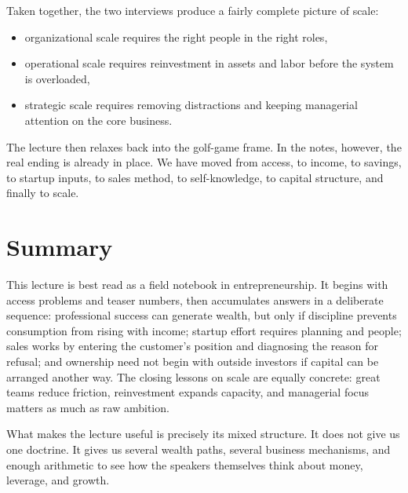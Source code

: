 Taken together, the two interviews produce a fairly complete picture of scale:
\begin{itemize}
\item organizational scale requires the right people in the right roles,
\item operational scale requires reinvestment in assets and labor before the system is overloaded,
\item strategic scale requires removing distractions and keeping managerial attention on the core business.
\end{itemize}

The lecture then relaxes back into the golf-game frame. In the notes, however, the real ending is already in place. We have moved from access, to income, to savings, to startup inputs, to sales method, to self-knowledge, to capital structure, and finally to scale.

\section{Summary}

This lecture is best read as a field notebook in entrepreneurship. It begins with access problems and teaser numbers, then accumulates answers in a deliberate sequence: professional success can generate wealth, but only if discipline prevents consumption from rising with income; startup effort requires planning and people; sales works by entering the customer's position and diagnosing the reason for refusal; and ownership need not begin with outside investors if capital can be arranged another way. The closing lessons on scale are equally concrete: great teams reduce friction, reinvestment expands capacity, and managerial focus matters as much as raw ambition.

What makes the lecture useful is precisely its mixed structure. It does not give us one doctrine. It gives us several wealth paths, several business mechanisms, and enough arithmetic to see how the speakers themselves think about money, leverage, and growth.